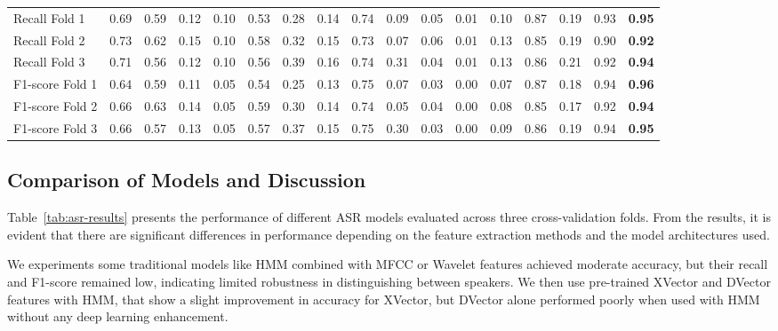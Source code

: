 \documentclass[conference]{IEEEtran}
\begin{document}
\begin{table*}[htbp]
{\begin{tabular}{|l|c|c|c|c|c|c|c|c|c|c|c|c|c|c|c|c|}
            \hline
            Recall Fold 1          & 0.69     & 0.59     & 0.12        & 0.10     & 0.53     & 0.28     & 0.14        & 0.74     & 0.09      & 0.05         & 0.01      & 0.10      & 0.87          & 0.19             & 0.93          & \textbf{0.95}          \\
            Recall Fold 2          & 0.73     & 0.62     & 0.15        & 0.10     & 0.58     & 0.32     & 0.15        & 0.73     & 0.07      & 0.06         & 0.01      & 0.13      & 0.85          & 0.19             & 0.90          & \textbf{0.92}          \\
            Recall Fold 3          & 0.71     & 0.56     & 0.12        & 0.10     & 0.56     & 0.39     & 0.16        & 0.74     & 0.31      & 0.04         & 0.01      & 0.13      & 0.86          & 0.21             & 0.92          & \textbf{0.94}          \\
            F1-score Fold 1        & 0.64     & 0.59     & 0.11        & 0.05     & 0.54     & 0.25     & 0.13        & 0.75     & 0.07      & 0.03         & 0.00      & 0.07      & 0.87          & 0.18             & 0.94          & \textbf{0.96}          \\
            F1-score Fold 2        & 0.66     & 0.63     & 0.14        & 0.05     & 0.59     & 0.30     & 0.14        & 0.74     & 0.05      & 0.04         & 0.00      & 0.08      & 0.85          & 0.17             & 0.92          & \textbf{0.94}          \\
            F1-score Fold 3        & 0.66     & 0.57     & 0.13        & 0.05     & 0.57     & 0.37     & 0.15        & 0.75     & 0.30      & 0.03         & 0.00      & 0.09      & 0.86          & 0.19             & 0.94          & \textbf{0.95}          \\
            \hline
        \end{tabular}
    }
\end{table*}
\subsection{Comparison of Models and Discussion}

Table~\ref{tab:asr-results} presents the performance of different ASR models evaluated across three cross-validation folds. From the results, it is evident that there are significant differences in performance depending on the feature extraction methods and the model architectures used.

We experiments some traditional models like HMM combined with MFCC or Wavelet features achieved moderate accuracy, but their recall and F1-score remained low, indicating limited robustness in distinguishing between speakers. We then use pre-trained XVector and DVector features with HMM, that show a slight improvement in accuracy for XVector, but DVector alone performed poorly when used with HMM without any deep learning enhancement.
\end{document}
